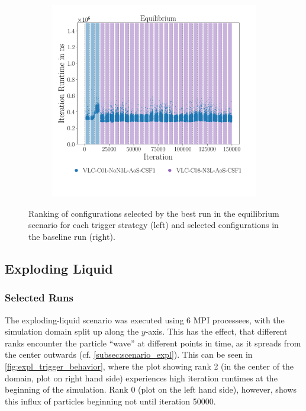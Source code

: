 \begin{figure}[htpb]
\begin{subfigure}{0.5\textwidth}
	\end{subfigure}%
	\begin{subfigure}{0.5\textwidth}
		\centering
		\includegraphics[width=\textwidth]{./Figures/plots/equilibrium_configs_static.pdf}
		\vspace*{-1.1cm}
	\end{subfigure}
	\caption{Ranking of configurations selected by the best run in the equilibrium scenario for each trigger strategy (left) and selected configurations in the baseline run (right).}
	\label{fig:equilibrium_optimality}
\end{figure}


\subsection{Exploding Liquid}
\subsubsection{Selected Runs}
The exploding-liquid scenario was executed using 6 MPI processees, with the simulation domain split up along the $y$-axis. This has the effect, that different ranks encounter the particle \enquote{wave} at different points in time, as it spreads from the center outwards (cf. \autoref{subsec:scenario_expl}). This can be seen in \autoref{fig:expl_trigger_behavior}, where the plot showing rank 2 (in the center of the domain, plot on right hand side) experiences high iteration runtimes at the beginning of the simulation. Rank 0 (plot on the left hand side), however, shows this influx of particles beginning not until iteration \num{50000}.

